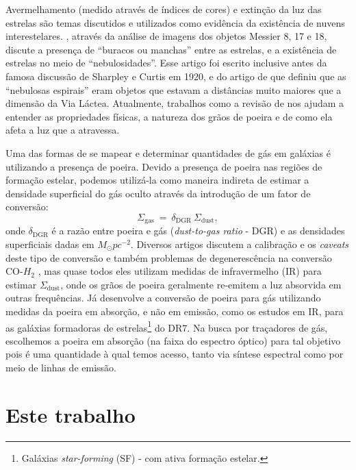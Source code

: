 Avermelhamento (medido através de índices de cores) e extinção da luz das estrelas são temas
discutidos e utilizados como evidência da existência de nuvens interestelares.
\citet{Barnard.1908a}, através da análise de imagens dos objetos Messier 8, 17 e 18, discute a
presença de ``buracos ou manchas'' entre as estrelas, e a existência de estrelas no meio de
``nebulosidades''. Esse artigo foi escrito inclusive antes da famosa discussão de Sharpley e Curtis
em 1920, e do artigo de \citet{Hubble.1925a} que definiu que as ``nebulosas espirais'' eram objetos
que estavam a distâncias muito maiores que a dimensão da Via Láctea. Atualmente, trabalhos como a
revisão de \citet{Draine.2003a} nos ajudam a entender as propriedades físicas, a natureza dos
grãos de poeira e de como ela afeta a luz que a atravessa.

Uma das formas de se mapear e determinar quantidades de gás em galáxias é utilizando a presença de
poeira. Devido a presença de poeira nas regiões de formação estelar, podemos utilizá-la como maneira
indireta de estimar a densidade superficial do gás oculto através da introdução de um fator de
conversão:
\begin{equation}
	\label{eq:dust2gas}
	\Sigma_{\mathrm{gas}}\ =\ \delta_{\mathrm{DGR}}\ \Sigma_{\mathrm{dust}}, 
\end{equation}
\noinden onde $\delta_{\mathrm{DGR}}$ é a razão entre poeira e gás ({\em dust-to-gas ratio} - DGR) e
as densidades superficiais dadas em $M_\odot pc^{-2}$. Diversos artigos discutem a calibração e
os {\em caveats} deste tipo de conversão e também problemas de degenerescência na conversão CO-$H_2$
\citep{Guiderdoni.Rocca.1987, Leroy.etal.2011a, Leroy.etal.2013a, RemyRuyer.etal.2014a}, mas quase
todos eles utilizam medidas de infravermelho (IR) para estimar $\Sigma_{\mathrm{dust}}$, onde os
grãos de poeira geralmente re-emitem a luz absorvida em outras frequências. Já
\citet{Brinchmann.etal.2013a} desenvolve a conversão de poeira para gás utilizando medidas da poeira
em absorção, e não em emissão, como os estudos em IR, para as galáxias formadoras de
estrelas\footnote{Galáxias {\em star-forming} (SF) - com ativa formação estelar.} do \SDSS DR7.
Na busca por traçadores de gás, escolhemos a poeira em absorção (na faixa do espectro óptico) para
tal objetivo pois é uma quantidade à qual temos acesso, tanto via síntese espectral como por meio
de linhas de emissão.

\section{Este trabalho}
\label{sec:intro:estetrabalho}

